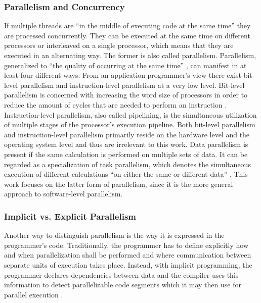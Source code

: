 \subsubsection{Parallelism and Concurrency}
If multiple threads are ``in the middle of executing code at the same time'' \cite[p.~124(?)]{MultiProgWithJavaTech} they are processed concurrently. They can be executed at the same time on different processors or interleaved on a single processor, which means that they are executed in an alternating way. The former is also called parallelism. Parallelism, generalized to ``the quality of occurring at the same time'' \cite[p.~91]{OSs_AConceptBasedApproach}, can manifest in at least four different ways: From an application programmer's view there exist bit-level parallelism and instruction-level parallelism at a very low level. Bit-level parallelism is concerned with increasing the word size of processors in order to reduce the amount of cycles that are needed to perform an instruction \cite[p.~15]{ParCompArchitecture_HW/SW_Approach}. Instruction-level parallelism, also called pipelining, is the simultaneous utilization of multiple stages of the processor's execution pipeline. Both bit-level parallelism and instruction-level parallelism primarily reside on the hardware level and the operating system level and thus are irrelevant to this work. Data parallelism is present if the same calculation is performed on multiple sets of data. It can be regarded as a specialization of task parallelism, which denotes the simultaneous execution of different calculations ``on either the same or different data'' \cite[p.~125]{ParCompArchitecture_HW/SW_Approach}. This work focuses on the latter form of parallelism, since it is the more general approach to software-level parallelism.

\subsubsection{Implicit vs. Explicit Parallelism}
Another way to distinguish parallelism is the way it is expressed in the programmer's code. Traditionally, the programmer has to define explicitly how and when parallelization shall be performed and where communication between separate units of execution takes place. Instead, with implicit programming, the programmer declares dependencies between data and the compiler uses this information to detect parallelizable code segments which it may then use for parallel execution \cite[p.~334]{ParallelScientificComputing}.

